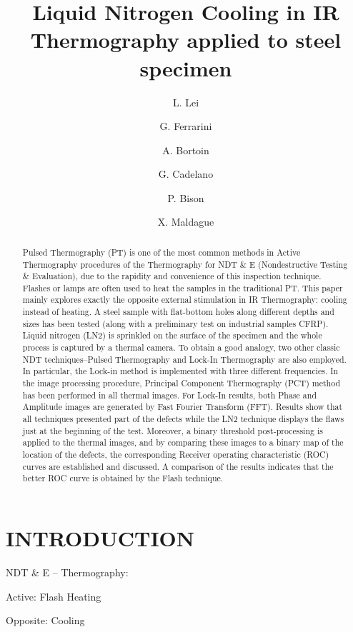 \documentclass[]{spie}  %
\title{Liquid Nitrogen Cooling in IR Thermography applied to steel specimen}
\author[a]{L. Lei}
\author[b]{G. Ferrarini}
\author[b]{A. Bortoin}
\author[b]{G. Cadelano}
\author[b]{P. Bison}
\author[a]{X. Maldague}
\affil[a]{LVSN, University Laval, 1065 avenue de la Médecine, Québec (Québec) G1V 0A6 Canada}
\affil[b]{CNR-ITC, Corso Stati Uniti 4, 35127 Padova PD, Italy}
\begin{document}
 
\maketitle

\begin{abstract}
Pulsed Thermography (PT) is one of the most common methods in Active Thermography procedures of the Thermography for NDT \& E (Nondestructive Testing \& Evaluation), due to the rapidity and convenience of this inspection technique. Flashes or lamps are often used to heat the samples in the traditional PT. This paper mainly explores exactly the opposite external stimulation in IR Thermography: cooling instead of heating. A steel sample with flat-bottom holes along different depths and sizes has been tested (along with a preliminary test on industrial samples CFRP). Liquid nitrogen (LN2) is sprinkled on the surface of the specimen and the whole process is captured by a thermal camera. To obtain a good analogy, two other classic NDT techniques--Pulsed Thermography and Lock-In Thermography are also employed. In particular, the  Lock-in  method  is  implemented  with  three  different  frequencies.  In  the  image  processing  procedure,  Principal Component Thermography (PCT) method has been performed in all thermal images. For Lock-In results, both Phase and Amplitude images are generated by Fast Fourier Transform (FFT). Results show that all techniques presented part of the defects while the LN2 technique displays the flaws just at the beginning of the test. Moreover, a binary threshold post-processing is applied to the thermal images, and by comparing these images to a binary map of the location of the defects, the corresponding Receiver operating characteristic (ROC) curves are established and discussed. A comparison of the results indicates that the better ROC curve is obtained by the Flash technique.   
\end{abstract}


\section{INTRODUCTION}
\label{sec:introduction}  %
NDT \& E -- Thermography:

Active: Flash Heating

Opposite: Cooling
\end{document}
